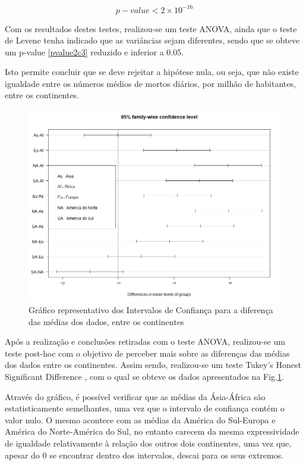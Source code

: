\documentclass[conference]{IEEEtran}
\begin{document}
\begin{equation}
p-value < 2\times 10^{-16}\label{pvalue2c3}
\end{equation}

Com os resultados destes testes, realizou-se um teste ANOVA, ainda que o teste de Levene tenha indicado que as variâncias sejam diferentes, sendo que se obteve um p-value \eqref{pvalue2c3} reduzido e inferior a 0.05.

Isto permite concluir que se deve rejeitar a hipótese nula, ou seja, que não existe igualdade entre os números médios de mortos diários, por milhão de habitantes, entre os continentes.

\begin{figure}[htbp]
\centerline{\includegraphics[width=0.95\columnwidth]{images/02.c.png}}
\caption{Gráfico representativo dos Intervalos de Confiança para a diferença das médias dos dados, entre os continentes}
\label{2c}
\end{figure}

Após a realização e conclusões retiradas com o teste ANOVA, realizou-se um teste post-hoc \cite{posthoc} com o objetivo de perceber mais sobre as diferenças das médias dos dados entre os continentes. Assim sendo, realizou-se um teste Tukey’s Honest Significant Difference \cite{tukey}, com o qual se obteve os dados apresentados na Fig.\ref{2c}.

Através do gráfico, é possível verificar que as médias da Ásia-África são estatisticamente semelhantes, uma vez que o intervalo de confiança contém o valor nulo. O mesmo acontece com as médias da América do Sul-Europa e América do Norte-América do Sul, no entanto carecem da mesma expressividade de igualdade relativamente à relação dos outros dois continentes, uma vez que, apesar do 0 se encontrar dentro dos intervalos, descai para os seus extremos.
\end{document}
